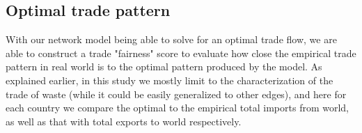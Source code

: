 \documentclass[dvipsnames]{article}
\newcommand{\js}[1]{{\color{MidnightBlue}{{[JS: \bf #1]}}}}
\begin{document}









\subsection{Optimal trade pattern}
\label{ssec:asso}

With our network model being able to solve for an optimal trade flow, we are able to construct a trade "fairness" score to evaluate how close the empirical trade pattern in real world is to the optimal pattern produced by the model. As explained earlier, in this study we mostly limit to the characterization of the trade of waste (while it could be easily generalized to other edges), and here for each country we compare the optimal to the empirical total imports from world, as well as that with total exports to world respectively.  
\end{document}
